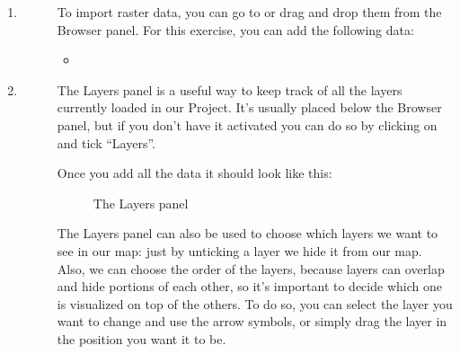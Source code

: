\documentclass[letterpaper,10pt,english]{sphinxmanual}
\let\sphinxpxdimen\pdfpxdimen\else\newdimen\sphinxpxdimen
\begin{document}
\begin{enumerate}
\begin{description}
\begin{itemize}
\item {} 

\item {} 

\item {} 

\end{itemize}

\end{description}

\item {} \begin{description}
\item[{}] \leavevmode
To import raster data, you can go to  or drag and drop them from the Browser panel.
For this exercise, you can add the following data:
\begin{itemize}
\item {} 

\end{itemize}

\end{description}

\item {} \begin{description}
\item[{}] \leavevmode
The Layers panel is a useful way to keep track of all the layers currently loaded in our Project. It’s usually placed
below the Browser panel, but if you don’t have it activated you can do so by clicking on  and tick “Layers”.

Once you add all the data it should look like this:

\begin{figure}[htbp]
\centering
\capstart

\noindent\sphinxincludegraphics[width=200\sphinxpxdimen]{{2.3.4_layers_panel}.PNG}
\caption{The Layers panel}\label{\detokenize{preparation/preparation:id4}}\end{figure}

The Layers panel can also be used to choose which layers we want to see in our map: just by unticking a layer we hide it from our map.
Also, we can choose the order of the layers, because layers can overlap and hide portions of each other, so it’s important to decide
which one is visualized on top of the others. To do so, you can select the layer you want to change and use the arrow symbols,
or simply drag the layer in the position you want it to be.

\end{description}

\end{enumerate}
\end{document}
